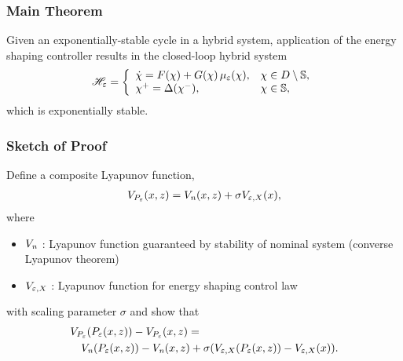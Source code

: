 \begin{frame}
  \frametitle{Main Theorem}

  \begin{theorem}
    Given an exponentially-stable cycle in a hybrid system, application
    of the energy shaping controller results in the closed-loop hybrid system
    \begin{align*}
      \mathscr{H}_{\varepsilon} = \left\{
      \begin{array}{l l}
        {\dot {\chi}} = F(\chi) + G(\chi) \, \mu_{\varepsilon}(\chi), & \chi \in D \setminus \mathbb{S},\\
        \chi^{+} = \Delta(\chi^{-}), & \chi \in \mathbb{S},
      \end{array}\right.
  \end{align*}
  which is exponentially stable.
  \end{theorem}
\end{frame}

\begin{frame}
  \frametitle{Sketch of Proof}
  Define a composite Lyapunov function,
  \begin{align*}
    V_{P_{\varepsilon}}(x, z) = V_{\mathit{n}}(x, z) + \sigma V_{\varepsilon, X}(x),
  \end{align*}
  where
  \begin{itemize}
  \item $V_{\mathit{n}}$ : Lyapunov function guaranteed by stability of nominal system
    (converse Lyapunov theorem)
  \item $V_{\varepsilon, X}$ : Lyapunov function for energy shaping control law
  \end{itemize}
  with scaling parameter $\sigma$ and show that
  \begin{align*}
    \lefteqn{\VP(\Pe\argsxz) - \VP\argsxz =}\\
    &&\Vn(\Pe\argsxz) - \Vn\argsxz + \sigma(\Vex(\Pe\argsxz) - \Vex(\zdx)).
  \end{align*}
\end{frame}

